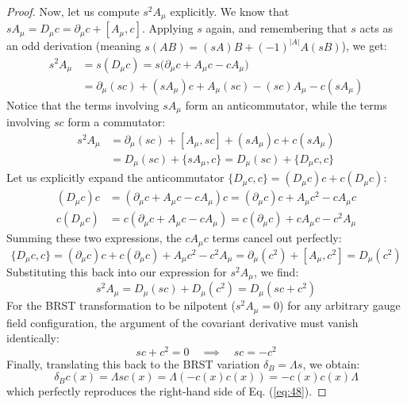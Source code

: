 \begin{proof}
    Now, let us compute \(s^2 A_\mu\) explicitly. We know that \(s A_\mu = D_\mu c = \partial_\mu c + [A_\mu, c]\). Applying \(s\) again, and remembering that \(s\) acts as an odd derivation (meaning \(s(AB) = (sA)B + (-1)^{|A|}A(sB)\)), we get:
    \[
        \begin{aligned}
            s^2 A_\mu & = s(D_\mu c) = s \big( \partial_\mu c + A_\mu c - c A_\mu \big)       \\
                      & = \partial_\mu(sc) + (s A_\mu)c + A_\mu (sc) - (sc)A_\mu - c(s A_\mu)
        \end{aligned}
    \]
    Notice that the terms involving \(sA_\mu\) form an anticommutator, while the terms involving \(sc\) form a commutator:
    \[
        \begin{aligned}
            s^2 A_\mu & = \partial_\mu(sc) + [A_\mu, sc] + (s A_\mu)c + c(s A_\mu) \\
                      & = D_\mu(sc) + \{s A_\mu, c\} = D_\mu(sc) + \{D_\mu c, c\}
        \end{aligned}
    \]
    Let us explicitly expand the anticommutator \(\{D_\mu c, c\} = (D_\mu c)c + c(D_\mu c)\):
    \[
        \begin{aligned}
            (D_\mu c)c & = (\partial_\mu c + A_\mu c - c A_\mu)c = (\partial_\mu c)c + A_\mu c^2 - c A_\mu c \\
            c(D_\mu c) & = c(\partial_\mu c + A_\mu c - c A_\mu) = c(\partial_\mu c) + c A_\mu c - c^2 A_\mu
        \end{aligned}
    \]
    Summing these two expressions, the \(c A_\mu c\) terms cancel out perfectly:
    \[
        \{D_\mu c, c\} = (\partial_\mu c)c + c(\partial_\mu c) + A_\mu c^2 - c^2 A_\mu = \partial_\mu(c^2) + [A_\mu, c^2] = D_\mu(c^2)
    \]
    Substituting this back into our expression for \(s^2 A_\mu\), we find:
    \[
        s^2 A_\mu = D_\mu(sc) + D_\mu(c^2) = D_\mu(sc + c^2)
    \]
    For the BRST transformation to be nilpotent (\(s^2 A_\mu = 0\)) for any arbitrary gauge field configuration, the argument of the covariant derivative must vanish identically:
    \[
        sc + c^2 = 0 \quad \implies \quad sc = -c^2
    \]
    Finally, translating this back to the BRST variation \(\delta_B = \Lambda s\), we obtain:
    \[
        \delta_B c(x) = \Lambda s c(x) = \Lambda (-c(x)c(x)) = -c(x)c(x)\Lambda
    \]
    which perfectly reproduces the right-hand side of Eq. (\ref{eq:48}).
\end{proof}

